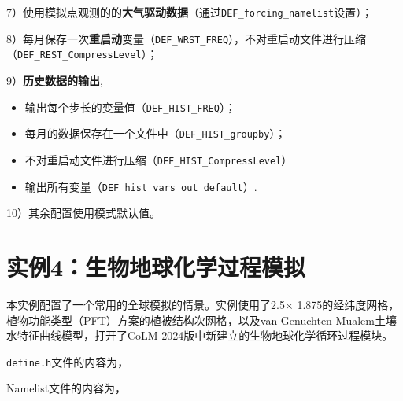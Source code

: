 \par
7）使用模拟点观测的的\textbf{大气驱动数据}（通过\texttt{DEF\_forcing\_namelist}设置）；\par
8）每月保存一次\textbf{重启动}变量（\texttt{DEF\_WRST\_FREQ}），不对重启动文件进行压缩（\texttt{DEF\_\allowbreak REST\_\allowbreak CompressLevel}）；\par
9）\textbf{历史数据的输出},
\begin{itemize}[nosep,leftmargin=4em]
    \item 输出每个步长的变量值（\texttt{DEF\_HIST\_FREQ}）；
    \item 每月的数据保存在一个文件中（\texttt{DEF\_HIST\_groupby}）；
    \item 不对重启动文件进行压缩（\texttt{DEF\_HIST\_CompressLevel}）
    \item 输出所有变量（\texttt{DEF\_hist\_vars\_out\_default}）.
\end{itemize} \par
10）其余配置使用模式默认值。

\section{实例4：生物地球化学过程模拟}

本实例配置了一个常用的全球模拟的情景。实例使用了2.5\textdegree $\times$ 1.875\textdegree 的经纬度网格，植物功能类型（PFT）方案的植被结构次网格，以及van Genuchten-Mualem土壤水特征曲线模型，打开了CoLM 2024版中新建立的生物地球化学循环过程模块。

\texttt{define.h}文件的内容为，


Namelist文件的内容为，


